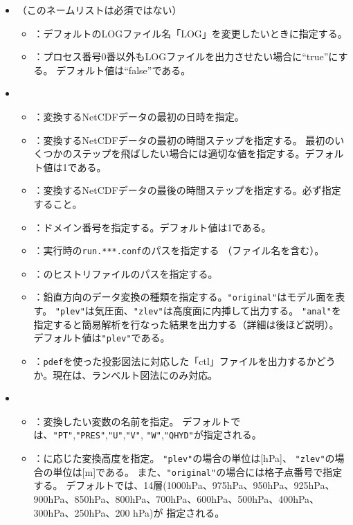 \begin{itemize}
 \item {}（このネームリストは必須ではない）
 \begin{itemize}
  \item {}：デフォルトのLOGファイル名「LOG」を変更したいときに指定する。
  \item {}：プロセス番号0番以外もLOGファイルを出力させたい場合に``true''にする。
        デフォルト値は``false''である。
 \end{itemize}
 \item {}
 \begin{itemize}
  \item {}：変換するNetCDFデータの最初の日時を指定。
  \item {}：変換するNetCDFデータの最初の時間ステップを指定する。
  最初のいくつかのステップを飛ばしたい場合には適切な値を指定する。デフォルト値は1である。
  \item {}：変換するNetCDFデータの最後の時間ステップを指定する。必ず指定すること。
  \item {}：ドメイン番号を指定する。デフォルト値は1である。
  \item {}：\scalerm 実行時の\verb|run.***.conf|のパスを指定する
        （ファイル名を含む）。
  \item {}：\scalerm のヒストリファイルのパスを指定する。
  \item {}：鉛直方向のデータ変換の種類を指定する。\verb|"original"|はモデル面を表す。
        \verb|"plev"|は気圧面、\verb|"zlev"|は高度面に内挿して出力する。
        \verb|"anal"|を指定すると簡易解析を行なった結果を出力する（詳細は後ほど説明）。
        デフォルト値は\verb|"plev"|である。
  \item {}：\verb|pdef|を使った投影図法に対応した「ctl」ファイルを出力するかどうか。現在は、ランベルト図法にのみ対応。
 \end{itemize}
 \item {}
 \begin{itemize}
  \item {}：変換したい変数の名前を指定。
  デフォルトでは、\verb|"PT"|,\verb|"PRES"|,\verb|"U"|,\verb|"V"|, \verb|"W"|,\verb|"QHYD"|が指定される。
  \item {}：に応じた変換高度を指定。
        \verb|"plev"|の場合の単位は[hPa]、
        \verb|"zlev"|の場合の単位は[m]である。
        また、\verb|"original"|の場合には格子点番号で指定する。
        デフォルトでは、14層(1000hPa、975hPa、950hPa、925hPa、900hPa、850hPa、800hPa、700hPa、600hPa、500hPa、400hPa、300hPa、250hPa、200 hPa)が
        指定される。
 \end{itemize}
\end{itemize}

